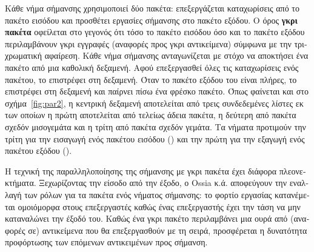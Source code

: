 \begin{greek}
Κάθε νήμα σήμανσης χρησιμοποιεί δύο πακέτα: επεξεργάζεται
καταχωρίσεις από το πακέτο εισόδου και προσθέτει εργασίες 
σήμανσης στο πακέτο εξόδου. Ο όρος \textbf{γκρι πακέτα} οφείλεται 
στο γεγονός ότι τόσο το πακέτο εισόδου όσο και το πακέτο εξόδου
περιλαμβάνουν γκρι εγγραφές (αναφορές προς γκρι αντικείμενα)
σύμφωνα με την τριχρωματική αφαίρεση. Κάθε νήμα σήμανσης ανταγωνίζεται
με στόχο να αποκτήσει ένα πακέτο από μια καθολική δεξαμενή.
Αφού επεξεργασθεί όλες τις καταχωρίσεις ενός πακέτου, το επιστρέφει
στη δεξαμενή. Όταν το πακέτο εξόδου του είναι πλήρες, το επιστρέφει
στη δεξαμενή και παίρνει πίσω ένα φρέσκο πακέτο. Όπως φαίνεται
και στο σχήμα~\ref{fig:par2}, η κεντρική δεξαμενή αποτελείται
από τρεις συνδεδεμένες λίστες εκ των οποίων η πρώτη αποτελείται
από τελείως άδεια πακέτα, η δεύτερη από πακέτα σχεδόν μισογεμάτα
και η τρίτη από πακέτα σχεδόν γεμάτα. Τα νήματα προτιμούν την
τρίτη για την εισαγωγή ενός πακέτου εισόδου ()
και την πρώτη για την εξαγωγή ενός πακέτου εξόδου ().

Η τεχνική της παραλληλοποίησης της σήμανσης με γκρι πακέτα έχει
διάφορα πλεονεκτήματα. Ξεχωρίζοντας την είσοδο από την έξοδο,
ο Ossia κ.ά. αποφεύγουν την εναλλαγή των ρόλων για τα πακέτα
ενός νήματος σήμανσης: το φορτίο εργασίας κατανέμεται ομοιόμορφα
στους επεξεργαστές καθώς ένας επεξεργαστής έχει την τάση να μην
καταναλώνει την έξοδό του. Καθώς ένα γκρι πακέτο περιλαμβάνει
μια ουρά από (αναφορές σε) αντικείμενα που θα επεξεργασθούν με
τη σειρά, προσφέρεται η δυνατότητα προφόρτωσης των επόμενων
αντικειμένων προς σήμανση.


\end{greek}
